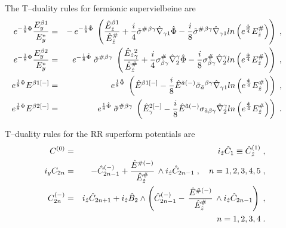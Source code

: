 \documentclass[a4paper,11pt]{article}
\begin{document}
The T--duality rules for fermionic supervielbeine are
\begin{eqnarray}\label{Tsf19}
e^{-{1\over 8}{\Phi}} 
{{E}_y^{{\beta}1} \over E_y^*} 
&=& - \,  e^{-{1\over 8}\hat{\Phi}}\; 
\left(
{\hat{E}_{\hat{z}}^{ {{\beta}1}}\over \hat{E}_{\hat{z}}^{ {\#}}} 
+ {i \over 4} 
\tilde{\sigma}^{ {\#}}{}^{ {\beta} {\gamma}}
\hat{\nabla}_{ {\gamma}1}\hat{\Phi}- {i \over 8} 
\tilde{\sigma}^{ {\#}}{}^{ {\beta} {\gamma}}
\hat{\nabla}_{ {\gamma}1} ln \left(e^{\hat{\Phi}\over 4} E_{\hat{z}}^{\#}
\right)\right) \; , \qquad \\  
\label{Tsf29}
e^{-{1\over 8}{\Phi}} 
{{E}_y^{ {\beta}2}\over E_y^*} &=&
\; e^{- {1\over 8}\hat{\Phi}}\;  
\tilde{\sigma}^{ {\#} {\beta} {\gamma}}
\; \left({\hat{E}_{\hat{z}}{}_{\gamma}^2 \over \hat{E}_{\hat{z}}^{ {\#}}} 
+ {i \over 4}  
{\sigma}^{\#}_{ {\beta} {\gamma}}
\hat{\nabla}^{ {\gamma}}_2\hat{\Phi} - 
{i \over 8}  
{\sigma}^{\#}_{ {\beta} {\gamma}}
\hat{\nabla}^{ {\gamma}}_2
ln \left({e^{\hat{\Phi}\over 4}} E_{\hat{z}}^{\#}\right)
\right) \; ,  \qquad \\ 
\label{Tsf1-}
e^{{1\over 8}{\Phi}} 
{E}^{ {\beta}1[-]} 
&=& \;  e^{{1\over 8}\hat{\Phi}}\; 
\left(\hat{E}^{{\beta}1[-]} - {i \over 8} \hat{E}^{ {\tilde{a}}(-)}
\tilde{\sigma}_{ {\tilde{a}}}{}^{ {\beta} {\gamma}}
\hat{\nabla}_{ {\gamma}1} ln \left({e^{\hat{\Phi}\over 4}} E_{\hat{z}}^{\#}
\right)
\right)
\; , \qquad \\  
\label{Tsf2-} 
e^{{1\over 8}{\Phi}} 
{E}^{ {\beta}2[-]}
&=& \; e^{{1\over 8}\hat{\Phi}}\;  
\tilde{\sigma}^{ {\#} {\beta} {\gamma}}
\; \left( \hat{E}_{ {\gamma}}^{2[-]}  - {i \over 8}  
\hat{E}^{{\tilde{a}}(-)}
{\sigma}_{\tilde{ {a}} {\beta} {\gamma}}
\hat{\nabla}^{ {\gamma}}_2
ln \left({e^{\hat{\Phi}\over 4}} E_{\hat{z}}^{\#}\right)\right)
\; . \qquad 
\end{eqnarray}

T--duality rules for the RR superform potentials are
\begin{eqnarray}
\label{Ts3} 
C^{(0)} &=&  i_{\hat{z}}\hat{C}_1 \equiv \hat{C}^{(1)}_{\hat{z}}\; , 
\nonumber \\ 
i_{y}C_{2n}  &=& - \hat{C}^{(-)}_{2n-1} + 
{\hat{E}^{ {\#}(-)}\over \hat{E}_{\hat{z}}^{ {\#}}}\,\wedge 
i_{\hat{z}} \hat{C}_{2n-1} \; , \quad n=1,2,3,4,5\; ,  
\nonumber \\ 
C^{(-)}_{2n} 
&=& i_{\hat{z}}\hat{C}_{2n+1} + 
i_{\hat{z}} \hat{B}_2 \wedge 
\left(\hat{C}^{(-)}_{2n-1} -  \,
{\hat{E}^{ {\#}(-)}\over \hat{E}_{\hat{z}}^{ {\#}}}\, 
\wedge 
i_{\hat{z}} \hat{C}_{2n-1} \right)\; , 
\\ \nonumber && \quad n=1,2,3,4\; .
\end{eqnarray} 
\end{document}
